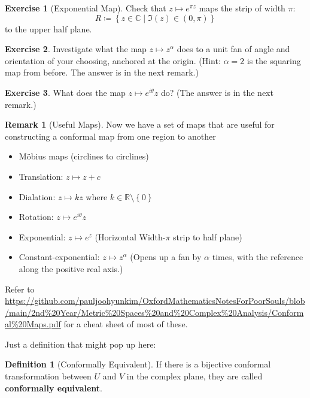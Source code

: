 \documentclass[a4paper, 12pt]{article}
\theoremstyle{definition}
\newtheorem{definition}{Definition}
\newtheorem{exercise}{Exercise}
\newtheorem{remark}{Remark}
\numberwithin{theorem}{section}
\numberwithin{definition}{section}
\numberwithin{exercise}{section}
\numberwithin{remark}{section}
\numberwithin{figure}{section}
\numberwithin{example}{section}
\newcommand{\R}{\mathbb{R}}
\newcommand{\C}{\mathbb{C}}
\begin{document}
\begin{exercise}[Exponential Map]
    Check that $z \mapsto e^{\pi z}$ maps the strip of width $\pi$:
    \begin{equation*}
        R \coloneqq \left\{ z \in \C \middle| \Im(z) \in \left( 0, \pi\right) \right\}
    \end{equation*}
    to the upper half plane.
\end{exercise}
\begin{exercise}
    Investigate what the map $z \mapsto z^{\alpha}$ does to a unit fan of angle and orientation of your choosing, anchored at the origin.
    (Hint: $\alpha = 2$ is the squaring map from before. The answer is in the next remark.)
\end{exercise}
\begin{exercise}
    What does the map $z \mapsto e^{i \theta} z$ do? (The answer is in the next remark.)
\end{exercise}
\begin{remark}[Useful Maps]
    Now we have a set of maps that are useful for constructing a conformal map from one region to another
    \begin{itemize}
        \item M\"obius maps (circlines to circlines)
        \item Translation: $z \mapsto z + c$
        \item Dialation: $z \mapsto kz$ where $k \in \R \setminus \left\{ 0 \right\}$
        \item Rotation: $z \mapsto e^{i \theta} z$
        \item Exponential: $z \mapsto e^z$ (Horizontal Width-$\pi$ strip to half plane)
        \item Constant-exponential: $z \mapsto z^{\alpha}$ (Opens up a fan by $\alpha$ times, with the reference along the positive real axis.)
    \end{itemize}
    Refer to \url{https://github.com/pauljoohyunkim/OxfordMathematicsNotesForPoorSouls/blob/main/2nd\%20Year/Metric\%20Spaces\%20and\%20Complex\%20Analysis/Conformal\%20Maps.pdf} for a cheat sheet of most of these.
\end{remark}
Just a definition that might pop up here:
\begin{definition}[Conformally Equivalent]
    If there is a bijective conformal transformation between $U$ and $V$ in the complex plane,
    they are called \textbf{conformally equivalent}.
\end{definition}
\end{document}
